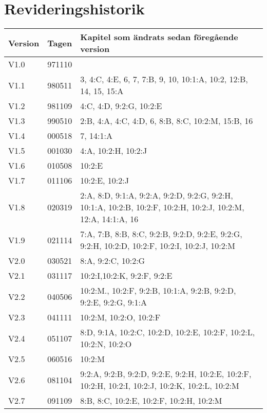 \documentclass[10pt]{article}
\begin{document}
\section*{Revideringshistorik}
\begin{center}
\begin{tabular}{| l | l | p{10cm} |}
    \hline
    Version & Tagen & Kapitel som ändrats sedan föregående version \\
    \hline
    V1.0 & 971110 & \\
    \hline
    V1.1 & 980511 & 3, 4:C, 4:E, 6, 7, 7:B, 9, 10, 10:1:A, 10:2, 12:B,
    14, 15, 15:A \\
    \hline
    V1.2 & 981109 & 4:C, 4:D, 9:2:G, 10:2:E \\
    \hline
    V1.3 & 990510 & 2:B, 4:A, 4:C, 4:D, 6, 8:B, 8:C, 10:2:M, 15:B, 16 \\
    \hline
    V1.4 & 000518 & 7, 14:1:A \\
    \hline
    V1.5 & 001030 & 4:A, 10:2:H, 10:2:J \\
    \hline
    V1.6 & 010508 & 10:2:E \\
    \hline
    V1.7 & 011106 & 10:2:E, 10:2:J \\
    \hline
    V1.8 & 020319 & 2:A, 8:D, 9:1:A, 9:2:A, 9:2:D, 9:2:G, 9:2:H, 10:1:A,
    10:2:B, 10:2:F, 10:2:H, 10:2:J, 10:2:M, 12:A, 14:1:A, 16 \\
    \hline
    V1.9 & 021114 & 7:A, 7:B, 8:B, 8:C, 9:2:B, 9:2:D, 9:2:E, 9:2:G,
    9:2:H, 10:2:D, 10:2:F, 10:2:I, 10:2:J, 10:2:M \\
    \hline
    V2.0 & 030521 & 8:A, 9:2:C, 10:2:G \\
    \hline
    V2.1 & 031117 & 10:2:I,10:2:K, 9:2:F, 9:2:E \\
    \hline
    V2.2 & 040506 & 10:2:M., 10:2:F, 9:2:B, 10:1:A, 9:2:B, 9:2:D, 9:2:E,
    9:2:G, 9:1:A \\
    \hline
    V2.3 & 041111 & 10:2:M, 10:2:O, 10:2:F \\
    \hline
    V2.4 & 051107 & 8:D, 9:1A, 10:2:C, 10:2:D, 10:2:E, 10:2:F, 10:2:L,
    10:2:N, 10:2:O \\
    \hline
    V2.5 & 060516 & 10:2:M \\
    \hline
    V2.6 & 081104 & 9:2:A, 9:2:B, 9:2:D, 9:2:E, 9:2:H, 10:2:E, 10:2:F,
    10:2:H, 10:2:I, 10:2:J, 10:2:K, 10:2:L, 10:2:M \\
    \hline
    V2.7 & 091109 &  8:B, 8:C, 10:2:E, 10:2:F, 10:2:H, 10:2:M\\

\end{tabular}
\end{center}
\end{document}
